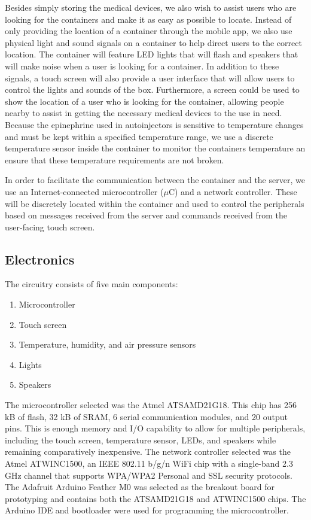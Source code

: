 Besides simply storing the medical devices, we also wish to assist users who are looking for the containers and make it as easy as possible to locate. Instead of only providing the location of a container through the mobile app, we also use physical light and sound signals on a container to help direct users to the correct location. The container will feature LED lights that will flash and speakers that will make noise when a user is looking for a container. In addition to these signals, a touch screen will also provide a user interface that will allow users to control the lights and sounds of the box. Furthermore, a screen could be used to show the location of a user who is looking for the container, allowing people nearby to assist in getting the necessary medical devices to the use in need. Because the epinephrine used in autoinjectors is sensitive to temperature changes and must be kept within a specified temperature range, we use a discrete temperature sensor inside the container to monitor the containers temperature an ensure that these temperature requirements are not broken.

In order to facilitate the communication between the container and the server, we use an Internet-connected microcontroller ($\mu$C) and a network controller. These will be discretely located within the container and used to control the peripherals based on messages received from the server and commands received from the user-facing touch screen.

\subsection{Electronics}

The circuitry consists of five main components:
\begin{enumerate}
    \item Microcontroller
    \item Touch screen
    \item Temperature, humidity, and air pressure sensors
    \item Lights
    \item Speakers
\end{enumerate}

The microcontroller selected was the Atmel ATSAMD21G18. This chip has 256 kB of flash, 32 kB of SRAM, 6 serial communication modules, and 20 output pins. This is enough memory and I/O capability to allow for multiple peripherals, including the touch screen, temperature sensor, LEDs, and speakers while remaining comparatively inexpensive. The network controller selected was the Atmel ATWINC1500, an IEEE 802.11 b/g/n WiFi chip with a single-band 2.3 GHz channel that supports WPA/WPA2 Personal and SSL security protocols. The Adafruit Arduino Feather M0 was selected as the breakout board for prototyping and contains both the ATSAMD21G18 and ATWINC1500 chips. The Arduino IDE and bootloader were used for programming the microcontroller.


